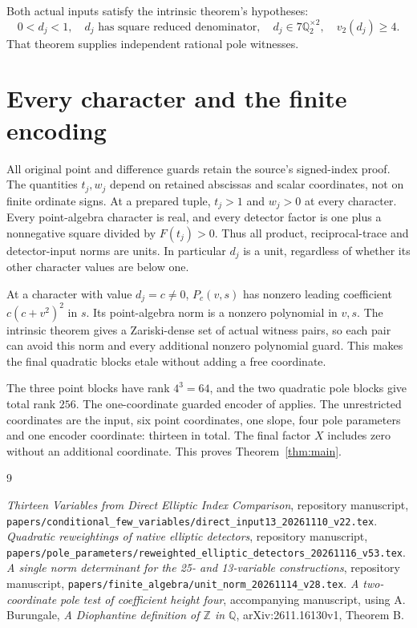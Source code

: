 \documentclass[11pt,a4paper]{article}
\newcommand{\Q}{\mathbb Q}\newcommand{\Z}{\mathbb Z}
\begin{document}
Both actual inputs satisfy the intrinsic theorem's hypotheses:
\[
 0<d_j<1,\quad d_j\text{ has square reduced denominator},\quad
 d_j\in7\Q_2^{\times2},\quad v_2(d_j)\ge4.
\]
That theorem supplies independent rational pole witnesses.

\section{Every character and the finite encoding}
All original point and difference guards retain the source's signed-index
proof. The quantities $t_j,w_j$ depend on retained abscissas and
scalar coordinates, not on finite ordinate signs. At a prepared tuple,
$t_j>1$ and $w_j>0$ at every character.
Every point-algebra character is real, and every detector factor is
one plus a nonnegative square divided by $F(t_j)>0$. Thus all product,
reciprocal-trace and detector-input norms are units. In particular
$d_j$ is a unit, regardless of whether its other character values are
below one.

At a character with value $d_j=c\ne0$, $P_c(v,s)$ has nonzero leading
coefficient $c(c+v^2)^2$ in $s$. Its point-algebra norm is a nonzero
polynomial in $v,s$. The intrinsic theorem gives a Zariski-dense set
of actual witness pairs, so each pair can avoid this norm and every
additional nonzero polynomial guard. This makes the final quadratic
blocks etale without adding a free coordinate.

The three point blocks have rank $4^3=64$, and the two quadratic pole
blocks give total rank $256$. The one-coordinate guarded encoder of
\cite{Unit} applies. The unrestricted coordinates are the input, six
point coordinates, one slope, four pole parameters and one encoder
coordinate: thirteen in total. The final factor $X$ includes zero
without an additional coordinate. This proves Theorem~\ref{thm:main}.

\begin{thebibliography}{9}\raggedright
{}\emph{Thirteen Variables from Direct Elliptic Index
Comparison}, repository manuscript,
\nolinkurl{papers/conditional_few_variables/direct_input13_20261110_v22.tex}.
\emph{Quadratic reweightings of native elliptic
detectors}, repository manuscript,
\nolinkurl{papers/pole_parameters/reweighted_elliptic_detectors_20261116_v53.tex}.
\emph{A single norm determinant for the 25- and 13-variable
constructions}, repository manuscript,
\nolinkurl{papers/finite_algebra/unit_norm_20261114_v28.tex}.
\emph{A two-coordinate pole test of coefficient height
four}, accompanying manuscript, using A. Burungale,
\emph{A Diophantine definition of $\Z$ in $\Q$},
arXiv:2611.16130v1, Theorem B.
\end{thebibliography}
\end{document}
